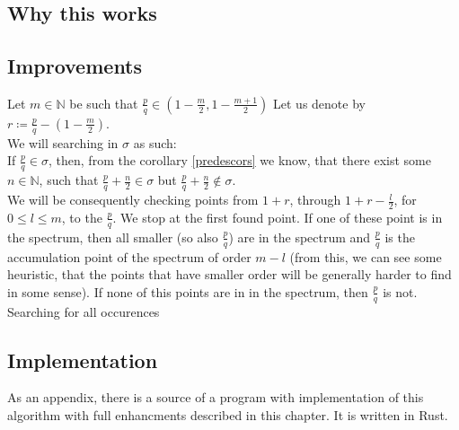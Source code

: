 \subsection{Why this works}

\subsection{Improvements}
Let $m \in \mathbb{N}$ be such that $\frac{p}{q} \in (1-\frac{m}{2},1-
\frac{m+1}{2})$
Let us denote by $r \coloneqq \frac{p}{q} - (1-\frac{m}{2})$. \\ 

We will searching in $\sigma$ as such: \\

If $\frac{p}{q} \in \sigma$, then, from the corollary \ref{predescors} we know, that there 
exist some $n \in \mathbb{N}$, such that $\frac{p}{q} + \frac{n}{2} \in \sigma$ but 
$\frac{p}{q} + \frac{n}{2} \not\in \sigma$. \\

We will be consequently checking points from $1+r$, through $1+r-\frac{l}{2}$, for 
$0 \leq l \leq m$, to the $\frac{p}{q}$. We stop at the first found point. 
If one of these point is in the spectrum, then all smaller (so also $\frac{p}{q}$) are in 
the spectrum and $\frac{p}{q}$ is the accumulation point of the spectrum of order $m-l$ 
(from this, 
 we can see some heuristic, that the points that have smaller order will be generally 
harder to find in some sense). If none of this points are in in the spectrum, then $\frac{p}{q}$ 
is not. \\


Searching for all occurences \\

\subsection{Implementation}
As an appendix, there is a source of a program with implementation of this algorithm 
with full  
enhancments described in this chapter. It is written in Rust. 




